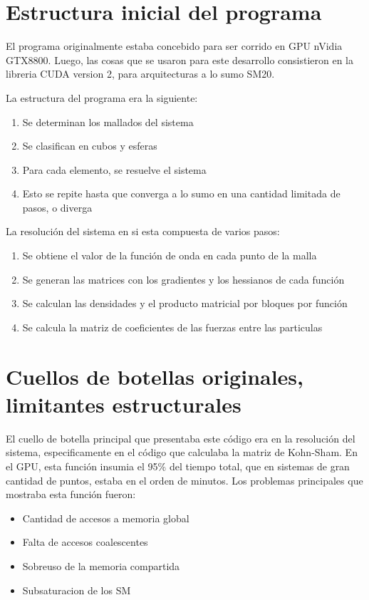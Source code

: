 \section{Estructura inicial del programa}

El programa originalmente estaba concebido para ser corrido en GPU nVidia GTX8800.
Luego, las cosas que se usaron para este desarrollo consistieron en la libreria CUDA version
2, para arquitecturas a lo sumo SM20.

La estructura del programa era la siguiente:
\begin{enumerate}
\item Se determinan los mallados del sistema
\item Se clasifican en cubos y esferas
\item Para cada elemento, se resuelve el sistema
\item Esto se repite hasta que converga a lo sumo en una cantidad limitada de pasos, o diverga
\end{enumerate}

La resoluci\'on del sistema en si esta compuesta de varios pasos:
\begin{enumerate}
\item Se obtiene el valor de la funci\'on de onda en cada punto de la malla
\item Se generan las matrices con los gradientes y los hessianos de cada funci\'on
\item Se calculan las densidades y el producto matricial por bloques por funci\'on
\item Se calcula la matriz de coeficientes de las fuerzas entre las particulas
\end{enumerate}


\section{Cuellos de botellas originales, limitantes estructurales}

El cuello de botella principal que presentaba este c\'odigo era en la
resoluci\'on del sistema, especificamente en el c\'odigo que calculaba la matriz de Kohn-Sham.
En el GPU, esta funci\'on insumia el 95\% del tiempo total, que en sistemas de gran cantidad
de puntos, estaba en el orden de minutos. Los problemas principales que mostraba esta funci\'on fueron:
\begin{itemize}
\item Cantidad de accesos a memoria global
\item Falta de accesos coalescentes
\item Sobreuso de la memoria compartida
\item Subsaturacion de los SM
\end{itemize}

